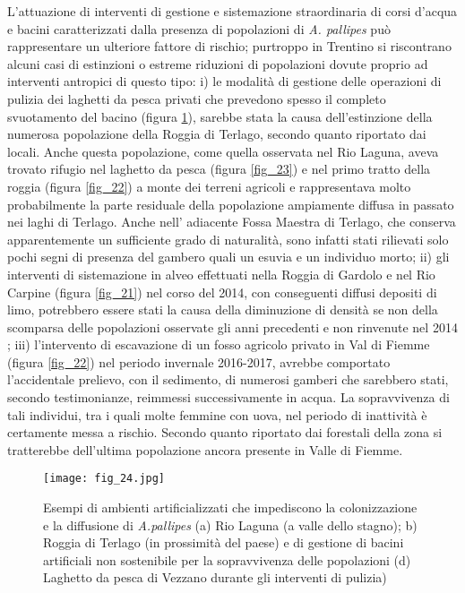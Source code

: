 \documentclass[11pt,a4paper,italian,twoside,openany]{memoir}
\begin{document}
L'attuazione di interventi di gestione e sistemazione straordinaria di corsi d'acqua e bacini caratterizzati dalla presenza di popolazioni di \emph{A. pallipes} può rappresentare un ulteriore fattore di rischio; purtroppo in Trentino si riscontrano alcuni casi di estinzioni o estreme riduzioni di popolazioni dovute proprio ad interventi antropici di questo tipo: i) le modalità di gestione delle operazioni di pulizia dei laghetti da pesca privati che prevedono spesso il completo svuotamento del bacino (figura \ref{fig_24}), sarebbe stata la causa dell'estinzione della numerosa popolazione della Roggia di Terlago, secondo quanto riportato dai locali. Anche questa popolazione, come quella osservata nel Rio Laguna, aveva trovato rifugio nel laghetto da pesca (figura \ref{fig_23}) e nel primo tratto della roggia (figura \ref{fig_22}) a monte dei terreni agricoli e rappresentava molto probabilmente la parte residuale della popolazione ampiamente diffusa in passato nei laghi di Terlago. Anche nell' adiacente Fossa Maestra di Terlago, che conserva apparentemente un sufficiente grado di naturalità, sono infatti stati rilievati solo pochi segni di presenza del gambero quali un esuvia e un individuo morto; ii) gli interventi di sistemazione in alveo effettuati nella Roggia di Gardolo e nel Rio Carpine (figura \ref{fig_21}) nel corso del 2014, con conseguenti diffusi depositi di limo, potrebbero essere stati la causa della diminuzione di densità se non della scomparsa delle popolazioni osservate gli anni precedenti e non rinvenute nel 2014 \cite{Maiolini 2014}; iii) l'intervento di escavazione di un fosso agricolo privato in Val di Fiemme (figura \ref{fig_22}) nel periodo invernale 2016-2017, avrebbe comportato l'accidentale prelievo, con il sedimento, di numerosi gamberi che sarebbero stati, secondo testimonianze, reimmessi successivamente in acqua. La sopravvivenza di tali individui, tra i quali molte femmine con uova, nel periodo di inattività è certamente messa a rischio. Secondo quanto riportato dai forestali della zona si tratterebbe dell'ultima popolazione ancora presente in Valle di Fiemme. 

\begin{figure}
  \centering
  \texttt{[image: fig\_24.jpg]}
  \caption{Esempi di ambienti artificializzati che impediscono la colonizzazione e la diffusione di \emph{A.pallipes} (a) Rio Laguna (a valle dello stagno); b) Roggia di Terlago (in prossimità del paese) e di gestione di bacini artificiali non sostenibile per la sopravvivenza delle popolazioni (d) Laghetto da pesca di Vezzano durante gli interventi di pulizia)}
  \label{fig_24}
\end{figure}
\end{document}
